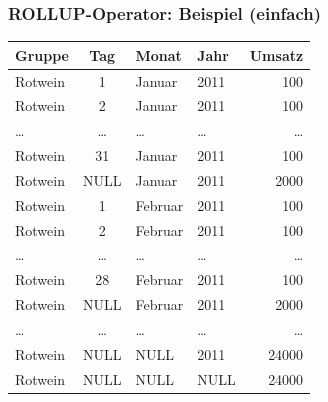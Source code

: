     
    
    \begin{frame}[shrink=10]
    
    \frametitle{ROLLUP-Operator: Beispiel (einfach)}
    
    \begin{center}
      \begin{tabular}{|l|c|l|l|r|}
        \hline
        \rowcolor{Gray}     {Gruppe} & {Tag} & {Monat} & {Jahr} &
        {Umsatz} \\
        \hline
        \hline
         {Rotwein} &  {1} &  {Januar} &  {2011} & 100 \\
         {Rotwein} &  {2} &  {Januar} &  {2011} & 100 \\
        \dots & \dots & \dots & \dots & \dots \\
         {Rotwein} &  {31} &  {Januar} &  {2011} & 100 \\
         {Rotwein} &  {NULL} &  {Januar} &  {2011} & 2000 \\
         {Rotwein} &  {1} &  {Februar} &  {2011} & 100 \\
         {Rotwein} &  {2} &  {Februar} &  {2011} & 100 \\
        \dots & \dots & \dots & \dots & \dots \\
         {Rotwein} &  {28} &  {Februar} &  {2011} & 100 \\
         {Rotwein} &  {NULL} &  {Februar} &  {2011} & 2000 \\
        \dots & \dots & \dots & \dots & \dots \\
         {Rotwein} &  {NULL} &  {NULL} &  {2011} & 24000 \\
         {Rotwein} &  {NULL} &  {NULL} &  {NULL} & 24000 \\
        \hline
      \end{tabular}
    \end{center}
    
    
    \end{frame}
    
    
